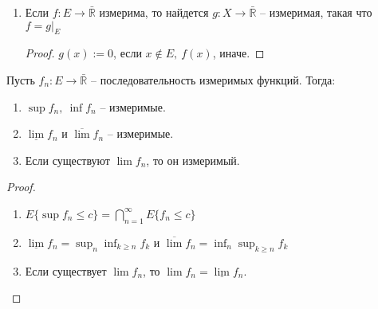 \begin{properties}
\begin{enumerate}
{            $f: E \rightarrow \bar{\mathbb{R}}$.

            \begin{proof}
                $E \{ f \leq c \} = \bigcup_{n=1}^{\infty} E_n \{ f \leq c \}$.
            \end{proof}
        }
        \item {
            Если $f: E \rightarrow \bar{\mathbb{R}}$ измерима, то найдется $g: X \rightarrow \bar{\mathbb{R}}$ -- измеримая, такая что $f = g|_E$

            \begin{proof}
                $g(x) := 0$, если $x \notin E, \ f(x)$, иначе.
            \end{proof}
        }
    \end{enumerate}
\end{properties}

\begin{theorem}
    Пусть $f_n: E \rightarrow \bar{\mathbb{R}}$ -- последовательность измеримых функций. Тогда:

    \begin{enumerate}
        \item $\sup{f_n}, \ \inf{f_n}$ -- измеримые.
        \item $\underline{\lim} f_n $ и $\overline{\lim} f_n$ -- измеримые.
        \item Если существуют $\lim f_n$, то он измеримый.
    \end{enumerate}
\end{theorem}

\begin{proof}
    \begin{enumerate}
        \item $E \{ \sup{f_n} \leq c \} = \bigcap_{n=1}^{\infty} E \{ f_n \leq c \}$
        \item $\underline{\lim}{f_n} = \sup_{n} \inf_{k \geq n} f_k $ и $\overline{\lim}{f_n} = \inf_{n} \sup_{k \geq n} f_k$
        \item Если существует $\lim f_n$, то $\lim f_n = \underline{\lim} f_n$.
    \end{enumerate}    
\end{proof}

